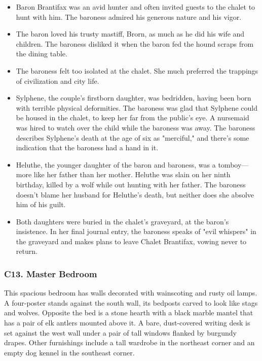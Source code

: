 \documentclass[10pt,a4paper,twoside,bg=print,twocolumn,openany,nodeprecatedcode]{dndbook}
\begin{document}
\begin{itemize}
\item Baron Brantifax was an avid hunter and often invited guests to the chalet to hunt with him. The baroness admired his generous nature and his vigor.
\item The baron loved his trusty mastiff, Brorn, as much as he did his wife and children. The baroness disliked it when the baron fed the hound scraps from the dining table.
\item The baroness felt too isolated at the chalet. She much preferred the trappings of civilization and city life.
\item Sylphene, the couple's firstborn daughter, was bedridden, having been born with terrible physical deformities. The baroness was glad that Sylphene could be housed in the chalet, to keep her far from the public's eye. A nursemaid was hired to watch over the child while the baroness was away. The baroness describes Sylphene's death at the age of six as "merciful," and there's some indication that the baroness had a hand in it.
\item Heluthe, the younger daughter of the baron and baroness, was a tomboy—more like her father than her mother. Heluthe was slain on her ninth birthday, killed by a wolf while out hunting with her father. The baroness doesn't blame her husband for Heluthe's death, but neither does she absolve him of his guilt.
\item Both daughters were buried in the chalet's graveyard, at the baron's insistence. In her final journal entry, the baroness speaks of "evil whispers" in the graveyard and makes plans to leave Chalet Brantifax, vowing never to return.
\end{itemize}

\subsubsection{C13. Master Bedroom}
\begin{DndReadAloud}{}
This spacious bedroom has walls decorated with wainscoting and rusty oil lamps. A four-poster stands against the south wall, its bedposts carved to look like stags and wolves. Opposite the bed is a stone hearth with a black marble mantel that has a pair of elk antlers mounted above it. A bare, dust-covered writing desk is set against the west wall under a pair of tall windows flanked by burgundy drapes. Other furnishings include a tall wardrobe in the northeast corner and an empty dog kennel in the southeast corner. 

\end{DndReadAloud}
\end{document}
